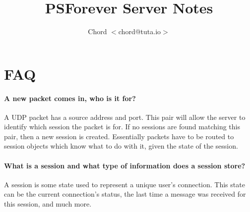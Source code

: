 \documentclass{article}
\begin{document}
\title{PSForever Server Notes}

\author{Chord $<$chord@tuta.io$>$}

\maketitle

%
%
%
%

\section*{FAQ}
\paragraph*{A new packet comes in, who is it for?}
A UDP packet has a source address and port. This pair will allow the
server to identify which session the packet is for. If no sessions are found
matching this pair, then a new session is created. Essentially packets have to
be routed to session objects which know what to do with it, given the state of the session.

\paragraph*{What is a session and what type of information does a session store?}
A session is some state used to represent a unique user's connection. This
state can be the current connection's status, the last time a message was
received for this session, and much more.

\paragraph*{}


\begin{thebibliography}{99}

\end{thebibliography}
\end{document}
